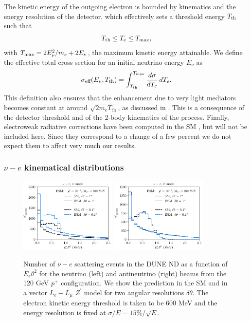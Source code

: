 The kinetic energy of the outgoing electron is bounded by kinematics and the energy resolution of the detector, which effectively sets a threshold energy $T_{\rm th}$ such that
%
\begin{align}
  T_{\rm th}  \le T_e \le T_{\rm max},
\end{align}
%   
with $T_{\rm max} = 2E_\nu^2/m_e+2E_\nu$, the maximum kinetic energy attainable. We define the effective total cross section for an initial neutrino energy $E_\nu$ as
%
\begin{equation}\label{eq:effective_nue_xsec}
\sigma_\text{eff}(E_\nu,T_\text{th}) = \int_{T_\text{th}}^{T_{\rm max}} \frac{d\sigma}{dT_e}\,dT_e.
\end{equation}
%
This definition also ensures that the enhancement due to very light mediators becomes constant at around $\sqrt{2 m_e T_\text{th}}$, as discussed in . This is a consequence of the detector threshold and of the 2-body kinematics of the process. Finally, electroweak radiative corrections have been computed in the SM \cite{Bahcall:1995mm,Passera:2000ug}, but 
will not be included here. Since they correspond to a change of a few percent we do not expect them to affect very much our results.

\subsubsection{$\nu-e$ kinematical distributions \label{sec:nue_kinematics}}

\begin{figure}[t]
%
\centering
%
\includegraphics[width=0.43\textwidth]{Etheta2_nu_new.pdf}
\includegraphics[width=0.43\textwidth]{Etheta2_nubar_new.pdf}
%
\caption{Number of $\nu-e$ scattering events in the DUNE ND as a function of $E_e\theta^2$ for the neutrino (left) and antineutrino (right) beams from the 120 GeV $p^+$ configuration. We show the prediction in the SM and in a vector $L_e-L_\mu$ $Z^\prime$ model for two angular resolutions $\delta\theta$. The electron kinetic energy threshold is taken to be $600$ MeV and the energy resolution is fixed at $\sigma/E = 15\%/\sqrt{E}$. \label{fig:nuedist}}
%
\end{figure}


